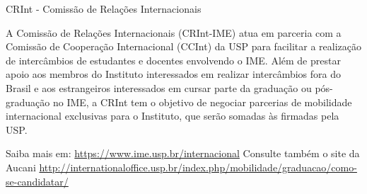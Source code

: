 \begin{secao}{CRInt - Comissão de Relações Internacionais}

A Comissão de Relações Internacionais (CRInt-IME) atua em parceria com a Comissão
de Cooperação Internacional (CCInt) da USP para facilitar a realização de
intercâmbios de estudantes e docentes envolvendo o IME. Além de prestar apoio aos
membros do Instituto interessados em realizar intercâmbios fora do Brasil e aos
estrangeiros interessados em cursar parte da graduação ou pós-graduação no IME,
a CRInt tem o objetivo de negociar parcerias de mobilidade internacional exclusivas
para o Instituto, que serão somadas às firmadas pela USP.

Saiba mais em: \url{https://www.ime.usp.br/internacional}
Consulte também o site da Aucani \url{http://internationaloffice.usp.br/index.php/mobilidade/graduacao/como-se-candidatar/}
\end{secao}

